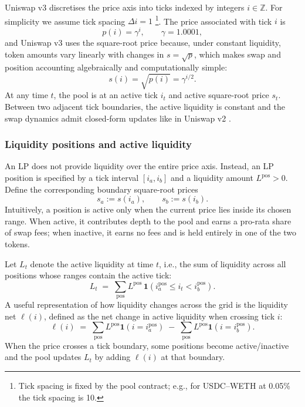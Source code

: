 \documentclass[11pt]{article}
\begin{document}
Uniswap v3 discretises the price axis into ticks indexed by integers $i \in \mathbb{Z}$.
For simplicity we assume tick spacing $\Delta i = 1$
\footnote{Tick spacing is fixed by the pool contract; e.g., for USDC--WETH at 0.05\% the tick spacing is 10.}.
The price associated with tick $i$ is
\begin{equation}
  p(i) = \gamma^{i}, \qquad \gamma = 1.0001,
\end{equation}
and Uniswap v3 uses the square-root price because, under constant liquidity, token amounts vary linearly with 
changes in \(s=\sqrt{p}\), which makes swap and position accounting algebraically and computationally simple:
\begin{equation}
  s(i) = \sqrt{p(i)} = \gamma^{i/2}.
\end{equation}
At any time $t$, the pool is at an active tick $i_t$ and active square-root price $s_t$. Between two adjacent tick boundaries, the active liquidity is constant and the swap dynamics admit closed-form updates like in Uniswap v2 \cite{Adams2020UniswapVC}.

\subsubsection{Liquidity positions and active liquidity}

An LP does not provide liquidity over the entire price axis. Instead, an LP position is specified by
a tick interval $[i_a,i_b]$ and a liquidity amount $L^{\mathrm{pos}}>0$.
Define the corresponding boundary square-root prices
\begin{equation}
  s_a := s(i_a), \qquad s_b := s(i_b).
\end{equation}
Intuitively, a position is active only when the current price lies inside its chosen range. When active, it contributes depth to the pool and earns a pro-rata share of swap fees; when inactive, it earns no fees and is held entirely in one of the two tokens.

Let $L_t$ denote the active liquidity at time $t$, i.e., the sum of liquidity across all positions whose ranges contain the active tick:
\begin{equation}
  L_t \;=\; \sum_{\mathrm{pos}} L^{\mathrm{pos}}\,\mathbf{1}\!\left(i_a^{\mathrm{pos}} \le i_t < i_b^{\mathrm{pos}}\right).
\end{equation}
A useful representation of how liquidity changes across the grid is the liquidity net $\ell(i)$, defined as the net change in active liquidity when crossing tick $i$:
\begin{equation}
  \ell(i) \;=\; \sum_{\mathrm{pos}} L^{\mathrm{pos}}\mathbf{1}(i = i_a^{\mathrm{pos}})\;-\;\sum_{\mathrm{pos}} L^{\mathrm{pos}}\mathbf{1}(i = i_b^{\mathrm{pos}}).
\end{equation}
When the price crosses a tick boundary, some positions become active/inactive and the pool updates $L_t$ by adding $\ell(i)$ at that boundary.
\end{document}
